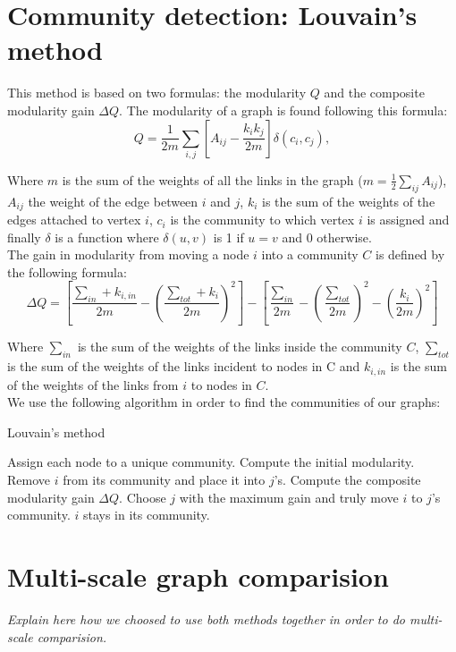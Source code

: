\documentclass[UTF8, twoside]{EPURapport}
\begin{document}
\chapter{Community detection: Louvain's method}

	\hspace{4ex}This method is based on two formulas: the modularity $Q$ and the composite modularity gain $\Delta Q$. The modularity of a graph is found following this formula:
\\

\[
Q = \frac{1}{2m}\underset{i,j}{\sum}\left[A_{ij} - \frac{k_ik_j}{2m}\right] \delta(c_i,c_j),
\]

	Where $m$ is the sum of the weights of all the links in the graph ($m = \frac{1}{2}\underset{ij}{\sum}A_{ij}$), $A_{ij}$ the weight of the edge between $i$ and $j$, $k_i$ is the sum of the weights of the edges attached to vertex $i$, $c_i$ is the community to which vertex $i$ is assigned and finally $\delta$ is a function where $\delta(u,v)$ is 1 if $u=v$ and 0 otherwise.
\\
	
	The gain in modularity from moving a node $i$ into a community $C$ is defined by the following formula:
\\

\[
\Delta Q = \left[ \frac{\sum_{in}+k_{i,in}}{2m} - \left( \frac{\sum_{tot}+k_i}{2m} \right)^2 \right] -  \left[ \frac{\sum_{in}}{2m} - \left( \frac{\sum_{tot}}{2m} \right)^2 - \left( \frac{k_i}{2m} \right)^2 \right]
\]

	Where $\sum_{in}$ is the sum of the weights of the links inside the community $C$, $\sum_{tot}$ is the sum of the weights of the links incident to nodes in C and $k_{i,in}$ is the sum of the weights of the links from $i$ to nodes in $C$.
\\

	We use the following algorithm in order to find the communities of our graphs:


\begin{algorithm}
  \caption{Louvain's method}
  \begin{algorithmic}[1]
      \State Assign each node to a unique community.
      \State Compute the initial modularity.
      \Repeat
		  	\State Remove $i$ from its community and place it into $j$'s.
		  	\State Compute the composite modularity gain $\Delta Q$.
		  \EndFor
		  	\State Choose $j$ with the maximum gain and truly move $i$ to $j$'s community.
		  \Else
		  	\State $i$ stays in its community.
		  \EndIf
		\EndFor
  \end{algorithmic}
\end{algorithm}

\chapter{Multi-scale graph comparision}

	\textit{Explain here how we choosed to use both methods together in order to do multi-scale comparision.}	
	
	
\end{document}
